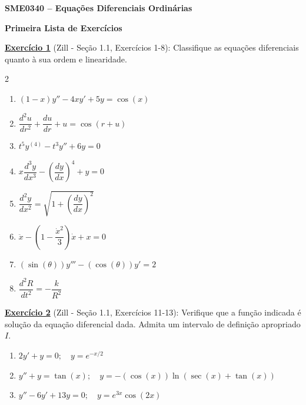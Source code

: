 \documentclass[oneside,12pt,a4paper]{report}
\begin{document}
    \begin{center}
        \fontsize{17.28}{17.28}
            \textbf{SME0340 -- Equações Diferenciais Ordinárias}

            \textbf{Primeira Lista de Exercícios}
    \end{center}

    \vspace{1.5cm}

    \noindent\textbf{\hyperlink{resp:ex1}{\hypertarget{quest:ex1}{Exercício 1}}} (Zill - Seção 1.1, Exercícios 1-8): Classifique as equações diferenciais quanto à sua ordem e linearidade.
    \begin{multicols}{2}
        \begin{enumerate}[label=\alph*)]
            \item $(1-x)y''-4xy'+5y=\cos(x)$
            \item $\dfrac{d^2u}{dr^2}+\dfrac{du}{dr}+u=\cos(r+u)$
            \item $t^5y^{(4)} - t^3y'' + 6y = 0$
            \item $x\dfrac{d^3y}{dx^3} - \left(\dfrac{dy}{dx}\right)^4 + y = 0$
            \item $\dfrac{d^2y}{dx^2} = \sqrt{1 + \left(\dfrac{dy}{dx}\right)^2}$
            \item $\ddot{x} - \left(1 - \dfrac{\dot{x}^2}{3}\right)\dot{x} + x = 0$
            \item $(\sin(\theta))y''' - (\cos(\theta))y' = 2$
            \item $\dfrac{d^2R}{dt^2} = -\dfrac{k}{R^2}$
        \end{enumerate}
    \end{multicols}
    \vspace{0.5cm}

    \noindent\textbf{\hyperlink{resp:ex2}{\hypertarget{quest:ex2}{Exercício 2}}} (Zill - Seção 1.1, Exercícios 11-13): Verifique que a função indicada é solução da equação diferencial dada. Admita um intervalo de definição apropriado $I$.
    \begin{enumerate}[label=\alph*)]
        \item $2y' + y = 0; \quad y = e^{-x/2}$
        \item $y'' + y = \tan(x); \quad y = -(\cos(x)) \ln(\sec(x) + \tan(x))$
        \item $y'' - 6y' + 13y = 0; \quad y = e^{3x} \cos(2x)$
    \end{enumerate}
    \vspace{0.5cm}
\end{document}
